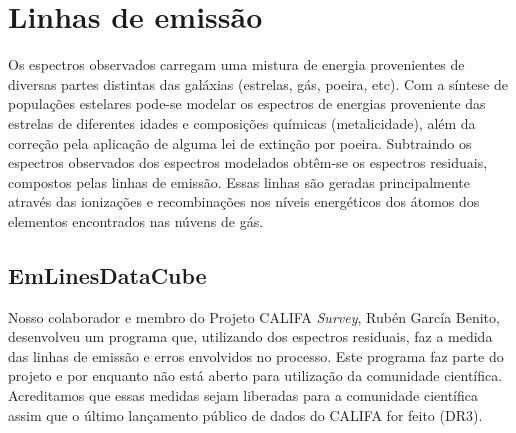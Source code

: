


\chapter{Linhas de emissão}
\label{sec:emlines}

Os espectros observados carregam uma mistura de energia provenientes de diversas partes distintas
das galáxias (estrelas, gás, poeira, etc). Com a síntese de populações estelares pode-se modelar os
espectros de energias proveniente das estrelas de diferentes idades e composições químicas
(metalicidade), além da correção pela aplicação de alguma lei de extinção por poeira. Subtraindo os
espectros observados dos espectros modelados obtêm-se os espectros residuais, compostos pelas linhas
de emissão. Essas linhas são geradas principalmente através das ionizações e recombinações nos
níveis energéticos dos átomos dos elementos encontrados nas núvens de gás.

\section{EmLinesDataCube}
\label{sec:emline:datacube}

Nosso colaborador e membro do Projeto CALIFA {\em Survey}, Rubén García Benito, desenvolveu um
programa que, utilizando dos espectros residuais, faz a medida das linhas de emissão e erros
envolvidos no processo. Este programa faz parte do projeto e por enquanto não está aberto para
utilização da comunidade científica. Acreditamos que essas medidas sejam liberadas para a
comunidade científica assim que o último lançamento público de dados do CALIFA for feito (DR3).

